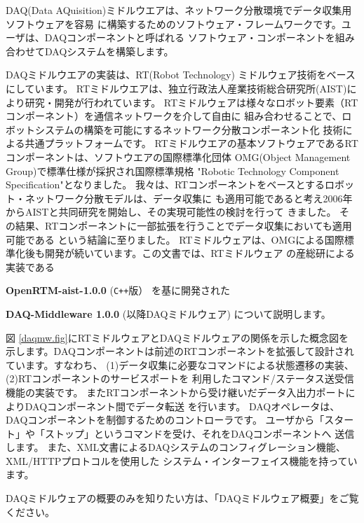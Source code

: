 \documentclass[a4j,10pt,dvips,onecolumn,oneside,final]{jarticle}%
\newcommand {\daqmwcurrent} {
	{\bf DAQ-Middleware 1.0.0}
}
\newcommand {\rtmcurrent} {
	{\bf OpenRTM-aist-1.0.0}
}
\begin{document}
DAQ(Data AQuisition)ミドルウエアは、ネットワーク分散環境でデータ収集用ソフトウェアを容易
に構築するためのソフトウェア・フレームワークです。ユーザは、DAQコンポーネントと呼ばれる
ソフトウェア・コンポーネントを組み合わせてDAQシステムを構築します。

DAQミドルウエアの実装は、RT(Robot Technology) ミドルウェア\cite{RTM}技術をベースにしています。
RTミドルウエアは、独立行政法人産業技術総合研究所(AIST)により研究・開発が行われています。
RTミドルウェアは様々なロボット要素（RTコンポーネント）を通信ネットワークを介して自由に
組み合わせることで、ロボットシステムの構築を可能にするネットワーク分散コンポーネント化
技術による共通プラットフォームです。
RTミドルウエアの基本ソフトウェアであるRTコンポーネントは、ソフトウエアの国際標準化団体
OMG(Object Management Group)で標準仕様が採択され国際標準規格 
"Robotic Technology Component Specification"\cite{RTM-OMG}となりました。
我々は、RTコンポーネントをベースとするロボット・ネットワーク分散モデルは、データ収集に
も適用可能であると考え2006年からAISTと共同研究を開始し、その実現可能性の検討を行って
きました\cite{CHEP06}。%
その結果、RTコンポーネントに一部拡張を行うことでデータ収集においても適用可能である
という結論に至りました。
RTミドルウェアは、OMGによる国際標準化後も開発が続いています。この文書では、RTミドルウェア
の産総研による実装である
\rtmcurrent (\verb|C++|版）
を基に開発された
\daqmwcurrent(以降DAQミドルウェア)
について説明します。

図 \ref{daqmw.fig}にRTミドルウェアとDAQミドルウェアの関係を示した概念図を
示します。DAQコンポーネントは前述のRTコンポーネントを拡張して設計されています。すなわち、
(1)データ収集に必要なコマンドによる状態遷移の実装、(2)RTコンポーネントのサービスポートを
利用したコマンド/ステータス送受信機能の実装です。
またRTコンポーネントから受け継いだデータ入出力ポートによりDAQコンポーネント間でデータ転送
を行います。
DAQオペレータは、DAQコンポーネントを制御するためのコントローラです。
ユーザから「スタート」や「ストップ」というコマンドを受け、それをDAQコンポーネントへ
送信します。
また、XML文書によるDAQシステムのコンフィグレーション機能、XML/HTTPプロトコルを使用した
システム・インターフェイス機能を持っています。

DAQミドルウェアの概要のみを知りたい方は、「DAQミドルウェア概要\cite{OVERVIEW}」をご覧ください。
\end{document}
